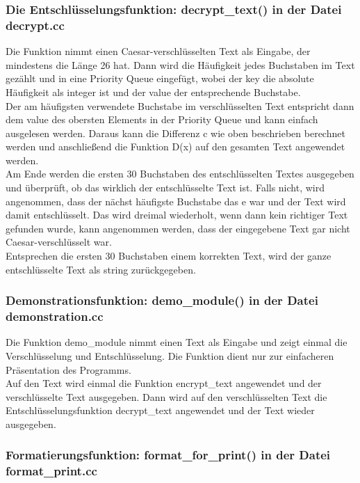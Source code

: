 \documentclass[ngerman,12pt]{article}
\begin{document}
\subsubsection*{Die Entschlüsselungsfunktion: decrypt\_text() in der Datei decrypt.cc}

Die Funktion nimmt einen Caesar-verschlüsselten Text als Eingabe, der mindestens die Länge 26 hat. Dann wird die Häufigkeit jedes Buchstaben im Text gezählt und in eine Priority Queue eingefügt, wobei der key die absolute Häufigkeit als integer ist und der value der entsprechende Buchstabe.\\
Der am häufigsten verwendete Buchstabe im verschlüsselten Text entspricht dann dem value des obersten Elements in der Priority Queue und kann einfach ausgelesen werden. Daraus kann die Differenz c wie oben beschrieben berechnet werden und anschließend die Funktion D(x) auf den gesamten Text angewendet werden.\\
Am Ende werden die ersten 30 Buchstaben des entschlüsselten Textes ausgegeben und überprüft, ob das wirklich der entschlüsselte Text ist.
Falls nicht, wird angenommen, dass der nächst häufigste Buchstabe das e war und der Text wird damit entschlüsselt. Das wird dreimal wiederholt, wenn dann kein richtiger Text gefunden wurde, kann angenommen werden, dass der eingegebene Text gar nicht Caesar-verschlüsselt war.\\
Entsprechen die ersten 30 Buchstaben einem korrekten Text, wird der ganze entschlüsselte Text als string zurückgegeben.

\subsubsection*{Demonstrationsfunktion: demo\_module() in der Datei demonstration.cc}

Die Funktion demo\_module nimmt einen Text als Eingabe und zeigt einmal die Verschlüsselung und Entschlüsselung. Die Funktion dient nur zur einfacheren Präsentation des Programms.\\
Auf den Text wird einmal die Funktion encrypt\_text angewendet und der verschlüsselte Text ausgegeben. Dann wird auf den verschlüsselten Text die Entschlüsselungsfunktion decrypt\_text angewendet und der Text wieder ausgegeben.

\subsubsection*{Formatierungsfunktion: format\_for\_print() in der Datei format\_print.cc}
\end{document}
